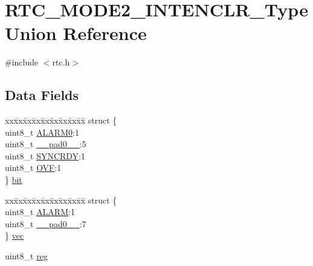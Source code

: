 \hypertarget{union_r_t_c___m_o_d_e2___i_n_t_e_n_c_l_r___type}{}\section{R\+T\+C\+\_\+\+M\+O\+D\+E2\+\_\+\+I\+N\+T\+E\+N\+C\+L\+R\+\_\+\+Type Union Reference}
\label{union_r_t_c___m_o_d_e2___i_n_t_e_n_c_l_r___type}


{\ttfamily \#include $<$rtc.\+h$>$}

\subsection*{Data Fields}
\begin{DoxyCompactItemize}
\item 
\begin{tabbing}
xx\=xx\=xx\=xx\=xx\=xx\=xx\=xx\=xx\=\kill
struct \{\\
\>uint8\_t \mbox{\hyperlink{union_r_t_c___m_o_d_e2___i_n_t_e_n_c_l_r___type_a5b88d7ce0817d8139138cfe94b5055d1}{ALARM0}}:1\\
\>uint8\_t \mbox{\hyperlink{union_r_t_c___m_o_d_e2___i_n_t_e_n_c_l_r___type_a8b4eebe79ded0459acec2f4950102ba3}{\_\_pad0\_\_}}:5\\
\>uint8\_t \mbox{\hyperlink{union_r_t_c___m_o_d_e2___i_n_t_e_n_c_l_r___type_aece75e176e4fd55bf68937f1b56bde63}{SYNCRDY}}:1\\
\>uint8\_t \mbox{\hyperlink{union_r_t_c___m_o_d_e2___i_n_t_e_n_c_l_r___type_ac6a3a2f132415ccc7b2b360497b74b15}{OVF}}:1\\
\} \mbox{\hyperlink{union_r_t_c___m_o_d_e2___i_n_t_e_n_c_l_r___type_a5ef3b29ee20c36b1db4b0fbc64b5ba98}{bit}}\\

\end{tabbing}\item 
\begin{tabbing}
xx\=xx\=xx\=xx\=xx\=xx\=xx\=xx\=xx\=\kill
struct \{\\
\>uint8\_t \mbox{\hyperlink{union_r_t_c___m_o_d_e2___i_n_t_e_n_c_l_r___type_a3c353493b89fa252249d2313097238f6}{ALARM}}:1\\
\>uint8\_t \mbox{\hyperlink{union_r_t_c___m_o_d_e2___i_n_t_e_n_c_l_r___type_a8b4eebe79ded0459acec2f4950102ba3}{\_\_pad0\_\_}}:7\\
\} \mbox{\hyperlink{union_r_t_c___m_o_d_e2___i_n_t_e_n_c_l_r___type_a9ef6122acfeba08f09be596ec4e569bc}{vec}}\\

\end{tabbing}\item 
uint8\+\_\+t \mbox{\hyperlink{union_r_t_c___m_o_d_e2___i_n_t_e_n_c_l_r___type_a9428adc9af4653a2050e2536b55dec8d}{reg}}
\end{DoxyCompactItemize}


